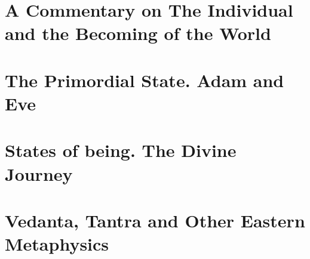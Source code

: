 \documentclass[a4paper,12pt,twoside]{book}
\begin{document}
\chapter[The Individual and the Becoming of the World]{A Commentary on The Individual and the Becoming of the World}




\chapter{The Primordial State. Adam and Eve}












\chapter{States of being. The Divine Journey}

















\chapter{Vedanta, Tantra and Other Eastern Metaphysics}













\end{document}
